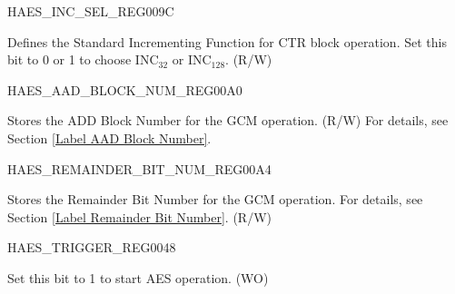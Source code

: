 \begin{register}{H}{AES\_INC\_SEL\_REG}{\hexprefix{}009C}\label{regdesc:AESINCSELREG}
%
%
\regnewline%
\begin{regdesc}\begin{reglist}
\item [AES\_INC\_SEL] Defines the Standard Incrementing Function for CTR block operation. Set this bit to 0 or 1 to choose INC$_{32}$ or INC$_{128}$. (R/W)
\end{reglist}\end{regdesc}
\end{register}


\begin{register}{H}{AES\_AAD\_BLOCK\_NUM\_REG}{\hexprefix{}00A0}\label{regdesc:AESAADBLOCKNUMREG}
%
\regnewline%
\begin{regdesc}\begin{reglist}
\item [AES\_AAD\_BLOCK\_NUM] Stores the ADD Block Number for the GCM operation. (R/W) For details, see Section \ref{Label AAD Block Number}.
\end{reglist}\end{regdesc}
\end{register}


\begin{register}{H}{AES\_REMAINDER\_BIT\_NUM\_REG}{\hexprefix{}00A4}\label{regdesc:AESREMAINDERBITNUMREG}
%
%
\regnewline%
\begin{regdesc}\begin{reglist}
\item [AES\_REMAINDER\_BIT\_NUM] Stores the Remainder Bit Number for the GCM operation. For details, see Section \ref{Label Remainder Bit Number}. (R/W)
\end{reglist}\end{regdesc}
\end{register}



\begin{register}{H}{AES\_TRIGGER\_REG}{\hexprefix{}0048}\label{regdesc:AESTRIGGERREG}
%
%
\regnewline%
\begin{regdesc}\begin{reglist}
\item [AES\_TRIGGER] Set this bit to 1 to start AES operation. (WO)
\end{reglist}\end{regdesc}
\end{register}


